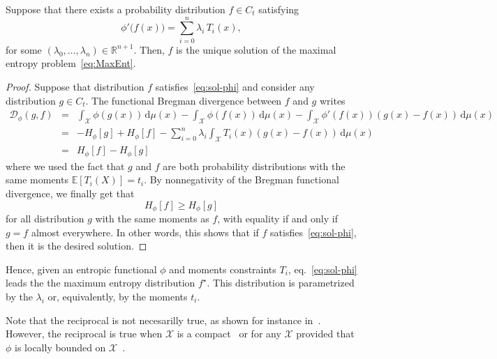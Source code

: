 \documentclass[entropy,article,submit,moreauthors,pdftex]{Definitions/mdpi}
\def\dmu{\mathrm{d}\mu}%
\def\fD{\mathcal{D}}%
\def\Rset{\mathbb{R}}%
\def\X{\mathcal{X}}%
\newcommand{\Esp}[1]{\mathbb{E}\left[ #1 \right]}%
\begin{document}
\begin{Proposition}
\label{prop:sol-phi}
%
  Suppose that there exists a probability distribution $f \in C_t$ satisfying
  \begin{equation}\label{eq:sol-phi}
  \phi'\big(f(x)\big) = \sum_{i=0}^n \lambda_i \, T_i(x),
  \end{equation}
  for  some $(\lambda_0,\ldots,\lambda_n)  \in \Rset^{n+1}$.   Then, $f$  is the
  unique solution of the maximal entropy problem~\eqref{eq:MaxEnt}.
\end{Proposition}
%
\begin{proof}
  Suppose that  distribution $f$  satisfies~\eqref{eq:sol-phi} and  consider any
  distribution $g \in  C_t$.  The functional Bregman divergence  between $f$ and
  $g$ writes
  \begin{eqnarray*}
  \fD_\phi(g,f) & = & \int_\X \phi(g(x)) \, \dmu(x) - \int_\X \phi(f(x)) \,
  \dmu(x) - \int_\X \phi'(f(x)) \left( g(x) - f(x) \right) \, \dmu(x)
  \\[2mm]
  & = & - H_\phi[g] + H_\phi[f] - \sum_{i=0}^n \lambda_i \int_\X T_i(x) \left(
  g(x) - f(x) \right) \, \dmu(x)
  \\[2mm]
  & = & H_\phi[f] - H_\phi[g]
  \end{eqnarray*}
  where we  used the fact  that $g$ and  $f$ are both  probability distributions
  with the same  moments $\Esp{T_i(X)} = t_i$.  By nonnegativity  of the Bregman
  functional divergence, we finally get that
  \[
  H_\phi[f] \ge H_\phi[g]
  \]
  for all distribution  $g$ with the same  moments as $f$, with  equality if and
  only if  $g = f$ almost  everywhere.  In other  words, this shows that  if $f$
  satisfies~\eqref{eq:sol-phi}, then it is the desired solution.
\end{proof}

Hence,  given  an entropic  functional  $\phi$  and moments  constraints  $T_i$,
eq.~\eqref{eq:sol-phi}  leads the  the maximum  entropy distribution  $f^\star$.
This distribution  is parametrized by  the $\lambda_i$ or, equivalently,  by the
moments $t_i$.

Note  that  the reciprocal  is  not  necesarilly  true,  as shown  for  instance
in~\cite{BorLew93}.   However,   the  reciprocal   is  true   when  $\X$   is  a
compact~\cite{Gir97} or for any $\X$ provided  that $\phi$ is locally bounded on
$\X$~\cite{Gir07}.




\end{document}
